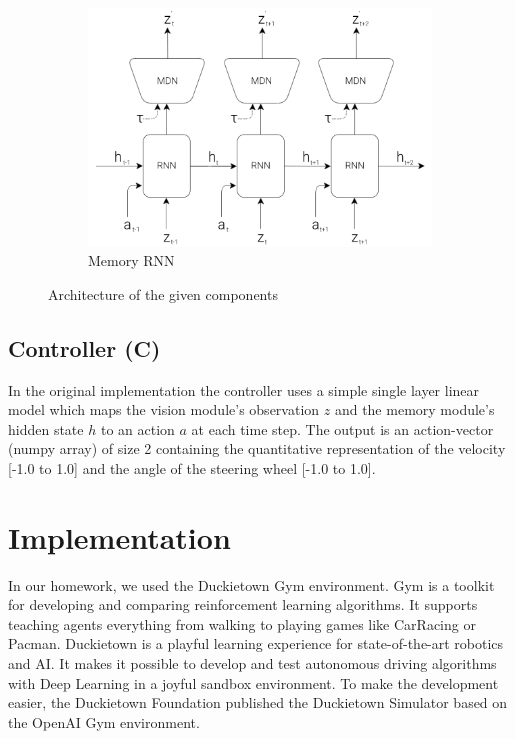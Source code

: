 \documentclass{article}
\begin{document}
\begin{figure}[!ht]
\begin{subfigure}[b]{.54\textwidth}
        \includegraphics[width=\textwidth]{RNN.png}
        \caption{Memory RNN}
        \label{fig:rnn}
    \end{subfigure}
    \caption{Architecture of the given components}
    \label{fig:architecture}
\end{figure}

\subsection{Controller (C)}
In the original implementation the controller uses a simple single layer linear model which maps the vision module’s observation $z$ and the memory module’s hidden state $h$ to an action $a$ at each time step. The output is an action-vector (numpy array) of size 2 containing the quantitative representation of the velocity [-1.0 to 1.0] and the angle of the steering wheel [-1.0 to 1.0].


\section{Implementation}


In our homework, we used the Duckietown Gym \cite{gym_duckietown} environment. Gym \cite{gym} is a toolkit for developing and comparing reinforcement learning algorithms. It supports teaching agents everything from walking to playing games like CarRacing or Pacman. Duckietown is a playful learning experience for state-of-the-art robotics and AI. It makes it possible to develop and test autonomous driving algorithms with Deep Learning in a joyful sandbox environment. To make the development easier, the Duckietown Foundation published the Duckietown Simulator based on the OpenAI Gym environment.
\end{document}
